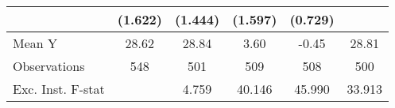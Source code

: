 {\begin{tabular}{l*{5}{c}}
            &     (1.622)         &     (1.444)         &     (1.597)         &     (0.729)         &                     \\
\midrule
Mean Y      &       28.62         &       28.84         &        3.60         &       -0.45         &       28.81         \\
Observations&         548         &         501         &         509         &         508         &         500         \\
Exc. Inst. F-stat&                     &       4.759         &      40.146         &      45.990         &      33.913         \\
\bottomrule
\end{tabular}
}
